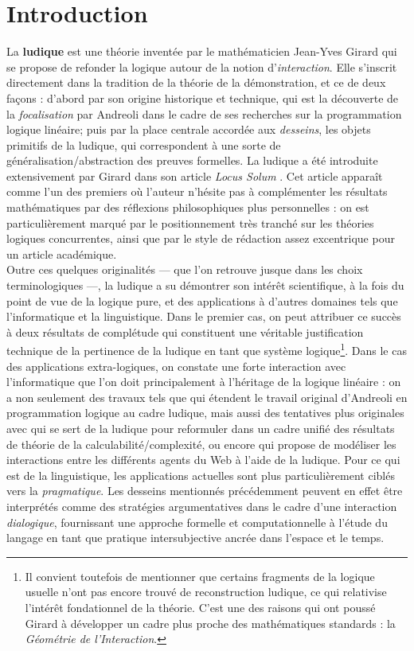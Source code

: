\documentclass[12pt]{report}
\begin{document}
\chapter*{Introduction}

La \textbf{ludique} est une théorie inventée par le mathématicien Jean-Yves Girard qui se propose de refonder la logique autour de la notion d'\emph{interaction}. Elle s'inscrit directement dans la tradition de la théorie de la démonstration, et ce de deux façons : d'abord par son origine historique et technique, qui est la découverte de la \emph{focalisation} par Andreoli \cite{And92} dans le cadre de ses recherches sur la programmation logique linéaire; puis par la place centrale accordée aux \emph{desseins}, les objets primitifs de la ludique, qui correspondent à une sorte de généralisation/abstraction des preuves formelles. La ludique a été introduite extensivement par Girard dans son article \textit{Locus Solum} \cite{Gir01}. Cet article apparaît comme l'un des premiers où l'auteur n'hésite pas à complémenter les résultats mathématiques par des réflexions philosophiques plus personnelles : on est particulièrement marqué par le positionnement très tranché sur les théories logiques concurrentes, ainsi que par le style de rédaction assez excentrique pour un article académique.\\

Outre ces quelques originalités --- que l'on retrouve jusque dans les choix terminologiques ---, la ludique a su démontrer son intérêt scientifique, à la fois du point de vue de la logique pure, et des applications à d'autres domaines tels que l'informatique et la linguistique. Dans le premier cas, on peut attribuer ce succès à deux résultats de complétude qui constituent une véritable justification technique de la pertinence de la ludique en tant que système logique\footnote{Il convient toutefois de mentionner que certains fragments de la logique usuelle n'ont pas encore trouvé de reconstruction ludique, ce qui relativise l'intérêt fondationnel de la théorie. C'est une des raisons qui ont poussé Girard à développer un cadre plus proche des mathématiques standards : la \textit{Géométrie de l'Interaction}.}. Dans le cas des applications extra-logiques, on constate une forte interaction avec l'informatique que l'on doit principalement à l'héritage de la logique linéaire : on a non seulement des travaux tels que \cite{Sau08} qui étendent le travail original d'Andreoli en programmation logique au cadre ludique, mais aussi des tentatives plus originales avec \cite{Ter11} qui se sert de la ludique pour reformuler dans un cadre unifié des résultats de théorie de la calculabilité/complexité, ou encore \cite{Fou11} qui propose de modéliser les interactions entre les différents agents du Web à l'aide de la ludique. Pour ce qui est de la linguistique, les applications actuelles sont plus particulièrement ciblés vers la \emph{pragmatique}. Les desseins mentionnés précédemment peuvent en effet être interprétés comme des stratégies argumentatives dans le cadre d'une interaction \emph{dialogique}, fournissant une approche formelle et computationnelle à l'étude du langage en tant que pratique intersubjective ancrée dans l'espace et le temps.\\
\end{document}
